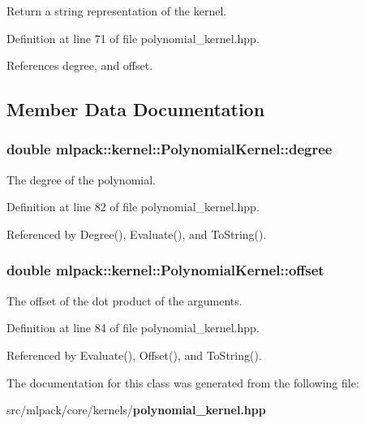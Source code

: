 Return a string representation of the kernel. 



Definition at line 71 of file polynomial\-\_\-kernel.\-hpp.



References degree, and offset.



\subsection{Member Data Documentation}
\subsubsection[{degree}]{\setlength{\rightskip}{0pt plus 5cm}double mlpack\-::kernel\-::\-Polynomial\-Kernel\-::degree\hspace{0.3cm}{\ttfamily [private]}}\label{classmlpack_1_1kernel_1_1PolynomialKernel_a1f6fb8a60c0a375048ced813b9aa5637}


The degree of the polynomial. 



Definition at line 82 of file polynomial\-\_\-kernel.\-hpp.



Referenced by Degree(), Evaluate(), and To\-String().

\subsubsection[{offset}]{\setlength{\rightskip}{0pt plus 5cm}double mlpack\-::kernel\-::\-Polynomial\-Kernel\-::offset\hspace{0.3cm}{\ttfamily [private]}}\label{classmlpack_1_1kernel_1_1PolynomialKernel_a1ee8bdd31064437ad7e515052c0597e0}


The offset of the dot product of the arguments. 



Definition at line 84 of file polynomial\-\_\-kernel.\-hpp.



Referenced by Evaluate(), Offset(), and To\-String().



The documentation for this class was generated from the following file\-:\begin{DoxyCompactItemize}
\item 
src/mlpack/core/kernels/{\bf polynomial\-\_\-kernel.\-hpp}\end{DoxyCompactItemize}
